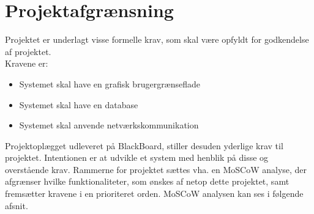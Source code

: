 \chapter{Projektafgrænsning}\label{ch:projektafgraensning}
Projektet er underlagt visse formelle krav, som skal være opfyldt for godkendelse af projektet. \\
Kravene er:
\begin{itemize}[noitemsep]
	\item Systemet skal have en grafisk brugergrænseflade
	\item Systemet skal have en database
	\item Systemet skal anvende netværkskommunikation
\end{itemize}

\noindent Projektoplægget udleveret på BlackBoard, stiller desuden yderlige krav til projektet. Intentionen er at udvikle et system med henblik på disse og overstående krav. Rammerne for projektet sættes vha. en MoSCoW analyse, der afgrænser hvilke funktionaliteter, som ønskes af netop dette projektet, samt fremsætter kravene i en prioriteret orden. MoSCoW analysen kan ses i følgende afsnit.
%
